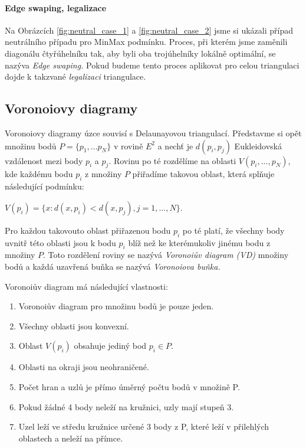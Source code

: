 \documentclass[12pt,a4paper]{article}
\begin{document}
\paragraph{Edge swaping, legalizace}
Na Obrázcích \ref{fig:neutral_case_1} a \ref{fig:neutral_case_2} jsme si ukázali případ neutrálního případu pro MinMax podmínku. Proces, při kterém jsme zaměnili diagonálu čtyřúhelníku tak, aby byli oba trojúhelníky lokálně optimální, se nazýva \textit{Edge swaping.} Pokud budeme tento proces aplikovat pro celou triangulaci dojde k takzvané \textit{legalizaci} triangulace.

\newpage
\subsection{Voronoiovy diagramy}

Voronoiovy diagramy úzce souvisí s Delaunayovou triangulací. Představme si opět množinu bodů $P = \{p_1,...p_N\} $ v rovině $E^2$ a nechť je $d(p_i,p_j) $ Eukleidovská vzdálenost mezi body $p_i$ a $p_j$. Rovinu po té rozdělíme na oblasti $V(p_i,...,p_N)$, kde každému bodu $p_i$ z množiny $P$ přiřadíme takovou oblast, která splňuje následující podmínku: 

$V(p_i) = \{ x: d(x, p_i) < d(x, p_j), j = 1,...,N\}$.

Pro každou takovouto oblast přiřazenou bodu $p_i$ po té platí, že všechny body uvnitř této oblasti jsou k bodu $p_i$ blíž než ke kterémukoliv jinému bodu z množiny $P$. Toto rozdělení roviny se nazývá \textit{Voronoiův diagram (VD)} množiny bodů a každá uzavřená buňka se nazývá \textit{Voronoiova buňka.}

\bigskip
Voronoiův diagram má následující vlastnosti: 
\begin{enumerate}
\item Voronoiův diagram pro množinu bodů je pouze jeden.
\item Všechny oblasti jsou konvexní.
\item Oblast $V(p_i)$ obsahuje jediný bod $p_i \in P$.
\item Oblasti na okraji jsou neohraničené.
\item Počet hran a uzlů je přímo úměrný počtu bodů v množině P.
\item Pokud žádné 4 body neleží na kružnici, uzly mají stupeň 3.
\item Uzel leží ve středu kružnice určené 3 body z P, které leží v přilehlých oblastech a neleží na přímce.
\end{enumerate}
\end{document}
